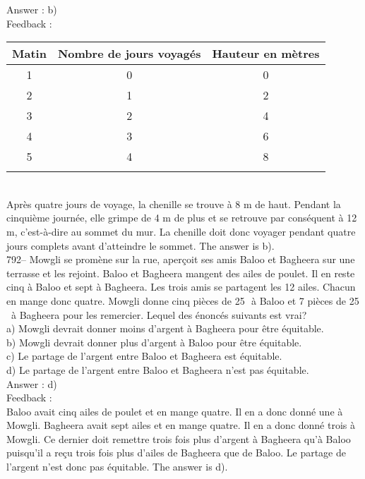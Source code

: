 ﻿\documentclass[letterpaper, 12pt]{article}
\begin{document}
Answer : b)\\

Feedback : \\

\begin{tabular}{|c|c|c|} \hline
{\bf Matin} & {\bf Nombre de jours voyag\'es} & {\bf Hauteur en m\`etres} \\
\hline \hline

1 & 0 & 0 \\ \hline
2 & 1 & 2\\ \hline
3 & 2 & 4\\ \hline
4 & 3 & 6\\ \hline
5 & 4 & 8\\ \hline
\multicolumn{3}{c}{}\\

\end{tabular}\\

Apr\`es quatre jours de voyage, la chenille se trouve \`a 8 m de haut.
Pendant la cinqui\`eme journ\'ee, elle grimpe de 4 m de plus et se retrouve
par cons\'equent \`a 12 m, c'est-\`a-dire au sommet du mur.  La chenille
doit donc voyager pendant quatre jours complets avant d'atteindre le sommet.
  The answer is b).\\

792-- Mowgli se prom\`ene sur la rue, aper\c coit ses amis Baloo et Bagheera
sur une terrasse et les rejoint.  Baloo et Bagheera mangent des ailes de
poulet.  Il en reste cinq \`a Baloo et sept \`a Bagheera.  Les trois amis se
partagent les 12 ailes.  Chacun en mange donc quatre.  Mowgli donne cinq
pi\`eces de 25\,\cent \ \`a Baloo et 7 pi\`eces de 25\,\cent \ \`a Bagheera
pour les remercier.  Lequel des \'enonc\'es suivants est vrai?\\
a) Mowgli devrait donner moins d'argent \`a Bagheera pour \^etre
\'equitable.\\
b) Mowgli devrait donner plus d'argent \`a Baloo pour \^etre \'equitable.\\
c) Le partage de l'argent entre Baloo et Bagheera est \'equitable.\\
d) Le partage de l'argent entre Baloo et Bagheera n'est pas \'equitable.\\

Answer : d)\\

Feedback : \\
Baloo avait cinq ailes de poulet et en mange quatre.  Il en a donc donn\'e
une \`a Mowgli.  Bagheera avait sept ailes et en mange quatre.  Il en a donc
donn\'e trois \`a Mowgli.  Ce dernier doit remettre trois fois plus d'argent
\`a Bagheera qu'\`a Baloo puisqu'il a re\c cu trois fois plus d'ailes de
Bagheera que de Baloo.  Le partage de l'argent n'est donc pas \'equitable.
The answer is d).\\
\end{document}
